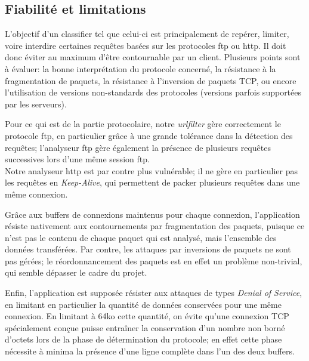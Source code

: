 \subsection{Fiabilité et limitations}
  L'objectif d'un classifier tel que celui-ci est principalement de repérer, limiter, voire interdire certaines requêtes basées sur les protocoles ftp ou http.
  Il doit donc éviter au maximum d'être contournable par un client. Plusieurs points sont à évaluer: la bonne interprétation du protocole concerné, la résistance à la
  fragmentation de paquets, la résistance à l'inversion de paquets TCP, ou encore l'utilisation de versions non-standards des protocoles (versions parfois supportées par
  les serveurs).
  
  Pour ce qui est de la partie protocolaire, notre \emph{urlfilter} gère correctement le protocole ftp, en particulier grâce à une grande tolérance dans la détection
  des requêtes; l'analyseur ftp gère également la présence de plusieurs requêtes successives lors d'une même session ftp.\\
  Notre analyseur http est par contre plus vulnérable; il ne gère en particulier pas les requêtes en \emph{Keep-Alive}, qui permettent de packer plusieurs requêtes dans une
  même connexion.
  
  Grâce aux buffers de connexions maintenus pour chaque connexion, l'application résiste nativement aux contournements par fragmentation des paquets, puisque ce n'est pas le
  contenu de chaque paquet qui est analysé, mais l'ensemble des données transférées. Par contre, les attaques par inversions de paquets ne sont pas gérées; le réordonnancement
  des paquets est en effet un problème non-trivial, qui semble dépasser le cadre du projet.
  
  Enfin, l'application est supposée résister aux attaques de types \emph{Denial of Service}, en limitant en particulier la quantité de données conservées pour une même connexion.
  En limitant à 64ko cette quantité, on évite qu'une connexion TCP spécialement conçue puisse entraîner la conservation d'un nombre non borné d'octets lors de la phase de
  détermination du protocole; en effet cette phase nécessite à minima la présence d'une ligne complète dans l'un des deux buffers.
